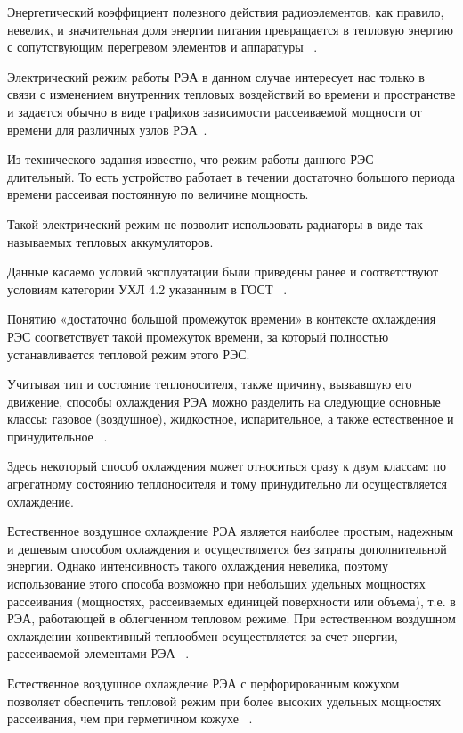Энергетический коэффициент полезного действия радиоэлементов, как
правило, невелик, и значительная доля энергии питания превращается в
тепловую энергию с сопутствующим перегревом элементов и аппаратуры
~\cite{Rotkop1976}.


Электрический режим работы РЭА в данном случае интересует нас только в
связи с изменением внутренних тепловых воздействий во времени и
пространстве и задается обычно в виде графиков зависимости
рассеиваемой мощности от времени для различных узлов РЭА~\cite{Rotkop1976}.

Из технического задания известно, что режим работы данного РЭС —
длительный. То есть устройство работает в течении достаточно большого
периода времени рассеивая постоянную по величине мощность.

Такой электрический режим не позволит использовать радиаторы в виде
так называемых тепловых аккумуляторов.

Данные касаемо условий эксплуатации были приведены ранее и
соответствуют условиям категории УХЛ 4.2 указанным в ГОСТ
~\cite{GOST-15150-69}.

Понятию «достаточно большой промежуток времени» в контексте охлаждения
РЭС соответствует такой промежуток времени, за который полностью
устанавливается тепловой режим этого РЭС.

Учитывая тип и состояние теплоносителя, также причину, вызвавшую его
движение, способы охлаждения РЭА можно разделить на следующие основные
классы: газовое (воздушное), жидкостное, испарительное, а также
естественное и принудительное ~\cite{Rotkop1976}.

Здесь некоторый способ охлаждения может относиться сразу к двум
классам: по агрегатному состоянию теплоносителя и тому принудительно
ли осуществляется охлаждение.

Естественное воздушное охлаждение РЭА является наиболее простым,
надежным и дешевым способом охлаждения и осуществляется без затраты
дополнительной энергии. Однако интенсивность такого охлаждения
невелика, поэтому использование этого способа возможно при небольших
удельных мощностях рассеивания (мощностях, рассеиваемых
единицей поверхности или объема), т.е. в РЭА, работающей в облегченном
тепловом режиме. При естественном воздушном охлаждении конвективный
теплообмен осуществляется за счет энергии,
рассеиваемой элементами РЭА ~\cite{Rotkop1976}.

Естественное воздушное охлаждение РЭА с перфорированным кожухом
позволяет обеспечить тепловой режим при более высоких удельных
мощностях рассеивания, чем при герметичном кожухе ~\cite{Rotkop1976}.

